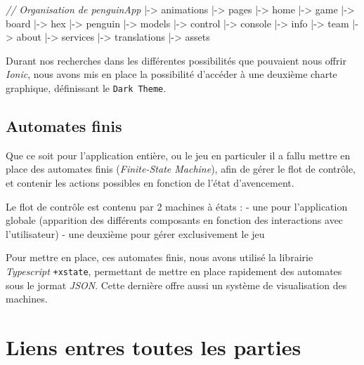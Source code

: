 \documentclass[a4paper,11pt]{article}
\newenvironment{Shaded}{}{}
\newcommand{\CommentTok}[1]{\textit{#1}}
\newcommand{\NormalTok}[1]{#1}
\begin{document}
\begin{Shaded}
\begin{Highlighting}[numbers=left,,firstnumber=0,]
\CommentTok{// Organisation de penguinApp}
\NormalTok{|-> animations}
\NormalTok{|-> pages}
\NormalTok{    |-> home}
\NormalTok{    |-> game}
\NormalTok{        |-> board}
\NormalTok{            |-> hex}
\NormalTok{            |-> penguin}
\NormalTok{            |-> models}
\NormalTok{        |-> control}
\NormalTok{        |-> console}
\NormalTok{        |-> info}
\NormalTok{     |-> team}
\NormalTok{     |-> about}
\NormalTok{|-> services}
\NormalTok{|-> translations}
\NormalTok{|-> assets}
\end{Highlighting}
\end{Shaded}

Durant nos recherches dans les différentes possibilités que pouvaient
nous offrir \emph{Ionic}, nous avons mis en place la possibilité
d'accéder à une deuxième charte graphique, définissant le
\texttt{Dark\ Theme}.

\subsection{Automates finis}\label{automates-finis}

Que ce soit pour l'application entière, ou le jeu en particuler il a
fallu mettre en place des automates finis (\emph{Finite-State Machine}),
afin de gérer le flot de contrôle, et contenir les actions possibles en
fonction de l'état d'avencement.

Le flot de contrôle est contenu par 2 machines à états : - une pour
l'application globale (apparition des différents composants en fonction
des interactions avec l'utilisateur) - une deuxième pour gérer
exclusivement le jeu

Pour mettre en place, ces automates finis, nous avons utilisé la
librairie \emph{Typescript} \texttt{+xstate}, permettant de mettre en
place rapidement des automates sous le jormat \emph{JSON}. Cette
dernière offre aussi un système de visualisation des machines.

\section{Liens entres toutes les
parties}\label{liens-entres-toutes-les-parties}
\end{document}
